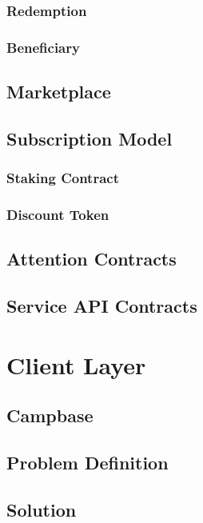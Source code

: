 \documentclass[letterpaper,11pt]{article}
\begin{document}
\subsubsection{Redemption}

\subsubsection{Beneficiary}

\subsection{Marketplace}

\subsection{Subscription Model}

\subsubsection{Staking Contract}

\subsubsection{Discount Token}

\subsection{Attention Contracts}

\subsection{Service API Contracts}

\section{Client Layer}

\subsection{Campbase}

\subsection{Problem Definition}

\subsection{Solution}
\end{document}
